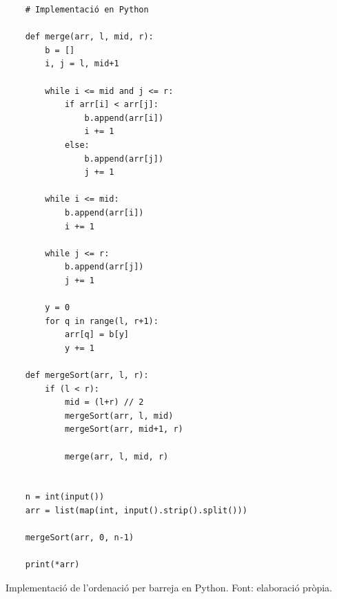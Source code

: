 \begin{longlisting}
    \begin{verbatim}
    # Implementació en Python
    
    def merge(arr, l, mid, r):
        b = []
        i, j = l, mid+1
    
        while i <= mid and j <= r:
            if arr[i] < arr[j]:
                b.append(arr[i])
                i += 1
            else:
                b.append(arr[j])
                j += 1
    
        while i <= mid:
            b.append(arr[i])
            i += 1
    
        while j <= r:
            b.append(arr[j])
            j += 1
    
        y = 0
        for q in range(l, r+1):
            arr[q] = b[y]
            y += 1
    
    def mergeSort(arr, l, r):
        if (l < r):
            mid = (l+r) // 2
            mergeSort(arr, l, mid)
            mergeSort(arr, mid+1, r)
    
            merge(arr, l, mid, r)
    
    
    n = int(input())
    arr = list(map(int, input().strip().split()))
    
    mergeSort(arr, 0, n-1)
    
    print(*arr)
    \end{verbatim}
    \caption[Implementació de l'ordenació per barreja en Python.]{Implementació de l'ordenació per barreja en Python. Font: elaboració pròpia.}
    \label{Figura}
\end{longlisting}

